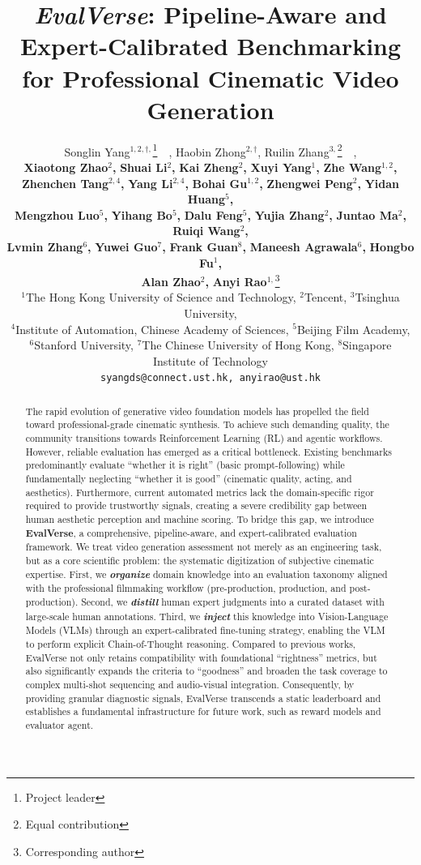 \documentclass{article}
\title{\textit{EvalVerse}: Pipeline-Aware and Expert-Calibrated Benchmarking for Professional Cinematic Video Generation}
\author{%
  Songlin Yang$^{1,2,\dagger,}$\thanks{Project leader}~~, 
  Haobin Zhong$^{2,\dagger}$, 
  Ruilin Zhang$^{3,}$\thanks{Equal contribution}~~,\\ 
  \textbf{Xiaotong Zhao}$^2$\textbf{,} 
  \textbf{Shuai Li}$^2$\textbf{,} \textbf{Kai Zheng}$^2$\textbf{,} \textbf{Xuyi Yang}$^{1}$\textbf{,} \textbf{Zhe Wang}$^{1,2}$\textbf{,} \\\textbf{Zhenchen Tang}$^{2,4}$\textbf{,} \textbf{Yang Li}$^{2,4}$\textbf{,}
  \textbf{Bohai Gu}$^{1,2}$\textbf{,} \textbf{Zhengwei Peng}$^2$\textbf{,} \textbf{Yidan Huang}$^5$\textbf{,} \\\textbf{Mengzhou Luo}$^5$\textbf{,} \textbf{Yihang Bo}$^5$\textbf{,} \textbf{Dalu Feng}$^5$\textbf{,}
  \textbf{Yujia Zhang}$^2$\textbf{,} \textbf{Juntao Ma}$^2$\textbf{,} \textbf{Ruiqi Wang}$^2$\textbf{,}  \\ \textbf{Lvmin Zhang}$^6$\textbf{,} \textbf{Yuwei Guo}$^7$\textbf{,} \textbf{Frank Guan}$^8$\textbf{,} \textbf{Maneesh Agrawala}$^6$\textbf{,} \textbf{Hongbo Fu}$^1$\textbf{,} \\ 
  \textbf{Alan Zhao}$^2$\textbf{,} \textbf{Anyi Rao}$^{1,}$\thanks{Corresponding author} \\
  $^1$The Hong Kong University of Science and Technology, $^2$Tencent, $^3$Tsinghua University,\\ 
  $^4$Institute of Automation, Chinese Academy of Sciences, $^5$Beijing Film Academy, \\
  $^6$Stanford University, $^7$The Chinese University of Hong Kong, $^8$Singapore Institute of Technology \\
  \texttt{syangds@connect.ust.hk, anyirao@ust.hk}\\}
\begin{document}
\maketitle

\begin{abstract}
The rapid evolution of generative video foundation models has propelled the field toward professional-grade cinematic synthesis. To achieve such demanding quality, the community transitions towards Reinforcement Learning (RL) and agentic workflows. However, reliable evaluation has emerged as a critical bottleneck. Existing benchmarks predominantly evaluate ``whether it is right'' (basic prompt-following) while fundamentally neglecting ``whether it is good'' (cinematic quality, acting, and aesthetics). Furthermore, current automated metrics lack the domain-specific rigor required to provide trustworthy signals, creating a severe credibility gap between human aesthetic perception and machine scoring. To bridge this gap, we introduce \textbf{EvalVerse}, a comprehensive, pipeline-aware, and expert-calibrated evaluation framework. We treat video generation assessment not merely as an engineering task, but as a core scientific problem: the systematic digitization of subjective cinematic expertise. First, we \textbf{\textit{organize}} domain knowledge into an evaluation taxonomy aligned with the professional filmmaking workflow (pre-production, production, and post-production). Second, we \textbf{\textit{distill}} human expert judgments into a curated dataset with large-scale human annotations. Third, we \textbf{\textit{inject}} this knowledge into Vision-Language Models (VLMs) through an expert-calibrated fine-tuning strategy, enabling the VLM to perform explicit Chain-of-Thought reasoning. Compared to previous works, EvalVerse not only retains compatibility with foundational ``rightness'' metrics, but also significantly expands the criteria to ``goodness'' and broaden the task coverage to complex multi-shot sequencing and audio-visual integration. Consequently, by providing granular diagnostic signals, EvalVerse transcends a static leaderboard and establishes a fundamental infrastructure for future work, such as reward models and evaluator agent.
\end{abstract}
\end{document}
